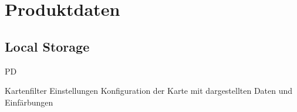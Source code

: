 \section{Produktdaten}

\subsection{Local Storage}
\begin{Kriterien}{PD}


 \item[Kartenfilter Einstellungen]
    Konfiguration der Karte mit dargestellten Daten und Einfärbungen

\end{Kriterien}